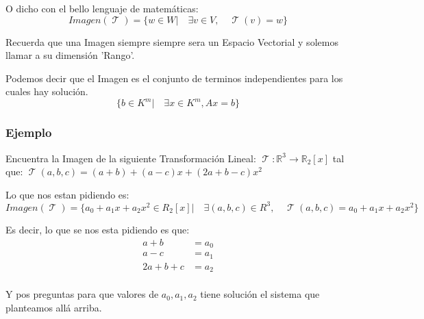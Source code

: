 \documentclass[12pt]{report}                                %
\DeclareMathOperator \LinealTransformation {\mathcal{T}}
\begin{document}
        O dicho con el bello lenguaje de matemáticas:
        \begin{equation}
            Imagen(\LinealTransformation) = \{w \in W |\quad \exists v \in V ,\quad \LinealTransformation(v) = w\}
        \end{equation}

        Recuerda que una Imagen siempre siempre sera un Espacio Vectorial y solemos
        llamar a su dimensión 'Rango'.

        Podemos decir que el Imagen es el conjunto de terminos independientes para los cuales
        hay solución.
        \begin{equation*}
            \{b \in K^m |\quad \exists x \in K^m, Ax = b \}
        \end{equation*}


            \clearpage
            \subsubsection{Ejemplo}
            Encuentra la Imagen de la siguiente Transformación Lineal:
            $\LinealTransformation : \mathbb{R}^3 \to \mathbb{R}_2[x]$ tal que: 
            $\LinealTransformation(a,b,c) = (a+b) + (a-c)x + (2a+b-c)x^2$

            Lo que nos estan pidiendo es:
            \begin{equation*}
                Imagen(\LinealTransformation) = 
                \{a_0+a_1x+a_2x^2 \in R_2[x] |\quad \exists (a,b,c) \in R^3 ,\quad 
                \LinealTransformation(a,b,c) = a_0+a_1x+a_2x^2\}
            \end{equation*}

            Es decir, lo que se nos esta pidiendo es que:
            \begin{equation*}
            \begin{split}
                a + b           & = a_0 \\
                a - c           & = a_1 \\
                2a + b + c      & = a_2 \\
             \end{split}
            \end{equation*}

            Y pos preguntas para que valores de $a_0, a_1, a_2$ tiene solución el 
            sistema que planteamos allá arriba.
\end{document}

